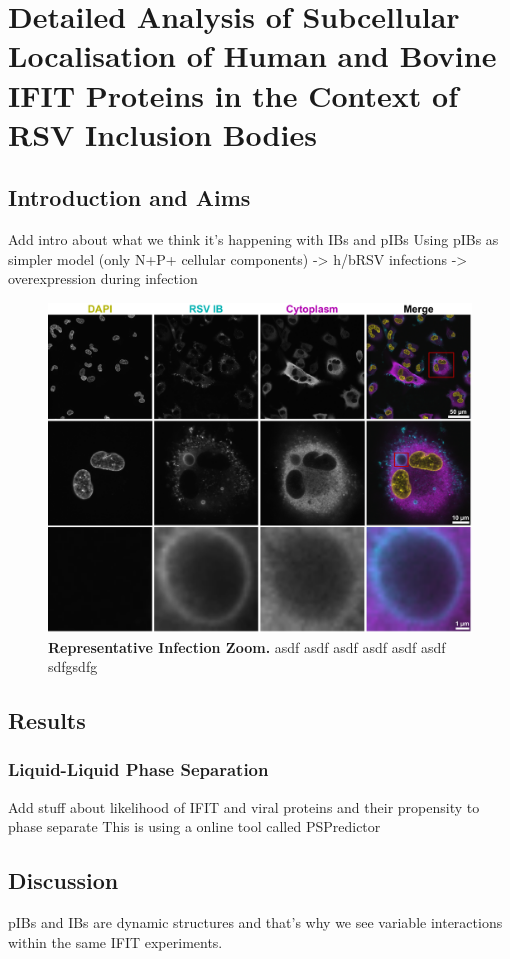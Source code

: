 \chapter{Detailed Analysis of Subcellular Localisation of Human and Bovine IFIT Proteins in the Context of RSV Inclusion Bodies}

\section{Introduction and Aims}
Add intro about what we think it’s happening with IBs and pIBs \newline
Using pIBs as simpler model (only N+P+ cellular components) -> h/bRSV infections -> overexpression during infection

\begin{figure}
    \centering
    \includegraphics[width=1\linewidth]{08. Chapter 3//Figs//01. Introduction/IB-zooms.pdf}
    \caption[Representative Infection Zoom.]{\textbf{Representative Infection Zoom.} asdf asdf asdf asdf asdf asdf sdfgsdfg}
    \label{Representative Infection Zoom}
\end{figure}

\section{Results}




\subsection{Liquid-Liquid Phase Separation} \label{Liquid-Liquid Phase Separation}
Add stuff about likelihood of IFIT and viral proteins and their propensity to phase separate \newline
This is using a online tool called PSPredictor


\section{Discussion}
pIBs and IBs are dynamic structures and that’s why we see variable interactions within the same IFIT experiments.